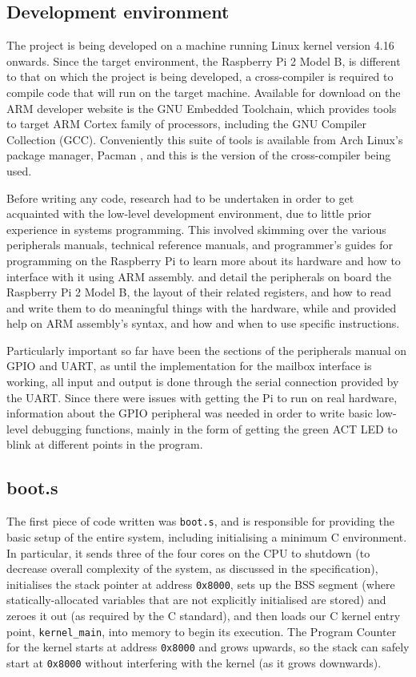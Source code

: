 \documentclass[10pt,a4paper]{article}
\newcommand{\code}[1]{\texttt{#1}}
\begin{document}
\subsection*{Development environment}
The project is being developed on a machine running Linux kernel version 4.16
onwards. Since the target environment, the Raspberry Pi 2 Model B, is different
to that on which the project is being developed, a cross-compiler is required to
compile code that will run on the target machine.  Available for download on the
ARM developer website \cite{GNUtoolchain} is the GNU Embedded Toolchain, which
provides tools to target ARM Cortex family of processors, including the GNU
Compiler Collection (GCC). Conveniently this suite of tools is available from
Arch Linux's package manager, Pacman \cite{pacman}, and this is the version of
the cross-compiler being used.

Before writing any code, research had to be undertaken in order to get
acquainted with the low-level development environment, due to little prior
experience in systems programming. This involved skimming over the various
peripherals manuals, technical reference manuals, and programmer's guides for
programming on the Raspberry Pi to learn more about its hardware and how to
interface with it using ARM assembly. \cite{BCM2835} and \cite{BCM2836} detail
the peripherals on board the Raspberry Pi 2 Model B, the layout of their related
registers, and how to read and write them to do meaningful things with the
hardware, while \cite{TRM} and \cite{PG} provided help on ARM assembly's syntax,
and how and when to use specific instructions.

Particularly important so far have been the sections of the peripherals manual
on GPIO and UART, as until the implementation for the mailbox interface is
working, all input and output is done through the serial connection provided by
the UART.  Since there were issues with getting the Pi to run on real hardware,
information about the GPIO peripheral was needed in order to write basic
low-level debugging functions, mainly in the form of getting the green ACT LED
to blink at different points in the program.

\subsection*{boot.s}
The first piece of code written was \code{boot.s}, and is responsible for
providing the basic setup of the entire system, including initialising a minimum
C environment. In particular, it sends three of the four cores on the CPU to
shutdown (to decrease overall complexity of the system, as discussed in the
specification), initialises the stack pointer at address \code{0x8000}, sets up
the BSS segment (where statically-allocated variables that are not explicitly
initialised are stored) and zeroes it out (as required by the C standard), and
then loads our C kernel entry point, \code{kernel\_main}, into memory to begin
its execution. The Program Counter for the kernel starts at address
\code{0x8000} and grows upwards, so the stack can safely start at \code{0x8000}
without interfering with the kernel (as it grows downwards).
\end{document}
